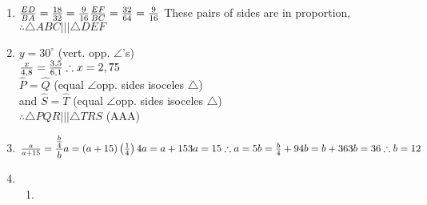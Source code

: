 \begin{eocsolutions}{}
{\begin{enumerate}[itemsep=5pt, label=\textbf{\arabic*}. ]
\begin{enumerate}[noitemsep, label=\textbf{(\alph*)} ]
\item $x=\sqrt{13^2+5^2} = \sqrt{139-25} =\sqrt{144} =12$ cm%

\item $x=\sqrt{2^2+7^2} = \sqrt{4+49} =\sqrt{53} =7,28$ cm%

\item $AC=\sqrt{25^2-7^2} = 576\\
\therefore AC=24\\
x^2 = 32^2+24^2\\
\therefore x=40$ mm%
	  \end{enumerate}
\item 
$\frac{ED}{BA} = \frac{18}{32} = \frac{9}{16}\\
\frac{EF}{BC} = \frac{32}{64} = \frac{9}{16}\\$
These pairs of sides are in proportion,\\ $\therefore \triangle ABC ||| \triangle DEF$
\item 
$y=30^{\circ}$ (vert. opp. $\angle$'s)\\
$\frac{x}{4,8} = \frac{3,5}{6,1} \\
\therefore x = 2,75$\\
$\hat{P} = \hat{Q}$ (equal $\angle$\s opp. sides isoceles $\triangle$)\\
and $\hat{S} = \hat{T}$ (equal $\angle$\s opp. sides isoceles $\triangle$)\\
$\therefore \triangle PQR ||| \triangle TRS$ (AAA)
\item 
$\frac{a}{a+15} = \dfrac{\frac{b}{4}}{b}\\
a = (a+15) \left(\frac{1}{4}\right) \\
4a = a+15\\
3a=15\\
\therefore a=5\\
\\
b=\frac{b}{4} +9\\
4b=b+36\\
3b=36\\
\therefore b=12$
\item %
 \begin{enumerate}[noitemsep, label=\textbf{(\alph*)} ]
      \item 


\end{enumerate}
\end{enumerate}}
\end{eocsolutions}

